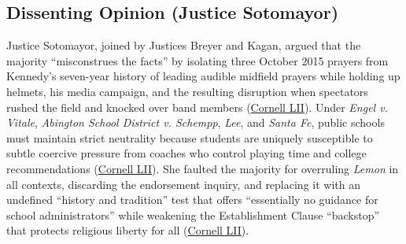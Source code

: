 \documentclass[12pt]{article}
\begin{document}
\subsection{Dissenting Opinion (Justice Sotomayor)}
Justice Sotomayor, joined by Justices Breyer and Kagan, argued that the majority ``misconstrues the facts'' by isolating three October 2015 prayers from Kennedy's seven-year history of leading audible midfield prayers while holding up helmets, his media campaign, and the resulting disruption when spectators rushed the field and knocked over band members (\href{https://www.law.cornell.edu/supremecourt/text/21-418}{Cornell LII}). Under \textit{Engel v. Vitale}, \textit{Abington School District v. Schempp}, \textit{Lee}, and \textit{Santa Fe}, public schools must maintain strict neutrality because students are uniquely susceptible to subtle coercive pressure from coaches who control playing time and college recommendations (\href{https://www.law.cornell.edu/supremecourt/text/21-418}{Cornell LII}). She faulted the majority for overruling \textit{Lemon} in all contexts, discarding the endorsement inquiry, and replacing it with an undefined ``history and tradition'' test that offers ``essentially no guidance for school administrators'' while weakening the Establishment Clause ``backstop'' that protects religious liberty for all (\href{https://www.law.cornell.edu/supremecourt/text/21-418}{Cornell LII}).
\end{document}
